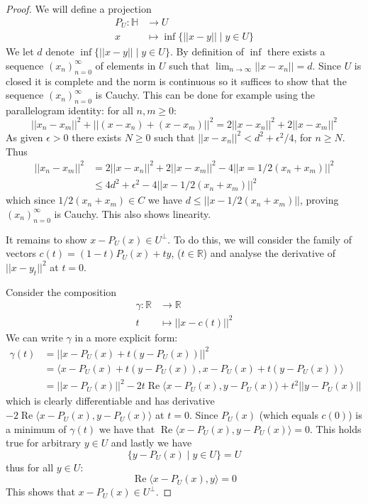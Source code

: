 \documentclass[12pt]{article}
\theoremstyle{plain}
\theoremstyle{definition}
\newcommand{\bb}[1]{\mathbb{#1}}
\newcommand{\lto}{\longrightarrow}
\begin{document}
\begin{proof}
We will define a projection
\begin{align*}
    P_U: \bb{H} &\lto U\\
    x &\longmapsto \operatorname{inf}\lbrace ||x - y|| \mid y \in U\rbrace
\end{align*}
We let $d$ denote $\operatorname{inf}\lbrace ||x - y|| \mid y \in U\rbrace$. By definition of $\operatorname{inf}$ there exists a sequence $(x_n)_{n=0}^\infty$ of elements in $U$ such that $\lim_{n\to \infty}||x - x_n|| = d$. Since $U$ is closed it is complete and the norm is continuous so it suffices to show that the sequence $(x_n)_{n=0}^\infty$ is Cauchy. This can be done for example using the parallelogram identity: for all $n,m\geq 0$:
\begin{equation}
    ||x_n - x_m||^2 + ||(x - x_n) + (x - x_m)||^2 = 2||x - x_n||^2 + 2||x - x_m||^2
\end{equation}
As given $\epsilon > 0$ there exists $N \geq 0$ such that $||x - x_n||^2 < d^2 + \epsilon^2/4$, for $n \geq N$. Thus
\begin{align*}
    ||x_n - x_m||^2 &= 2||x - x_n||^2 + 2||x - x_m||^2 - 4||x = 1/2(x_n + x_m)||^2\\
    &\leq 4d^2 + \epsilon^2 - 4||x - 1/2(x_n + x_m)||^2
\end{align*}
which since $1/2(x_n + x_m) \in C$ we have $d \leq ||x - 1/2(x_n + x_m)||$, proving $(x_n)_{n = 0}^\infty$ is Cauchy. This also shows linearity.

It remains to show $x - P_U(x) \in U^\perp$. To do this, we will consider the family of vectors $c(t) = (1-t)P_U(x) + ty$, ($t \in \bb{R}$) and analyse the derivative of $||x - y_t||^2$ at $t = 0$.

Consider the composition
\begin{align}
    \gamma: \bb{R} &\lto \bb{R}\\
    t &\longmapsto ||x - c(t)||^2
\end{align}
We can write $\gamma$ in a more explicit form:
\begin{align*}
    \gamma(t) &= ||x - P_U(x) + t(y - P_U(x))||^2\\
    &= \big\langle x - P_U(x) + t(y - P_U(x)),x - P_U(x) + t(y - P_U(x))\big\rangle\\
    &= ||x - P_U(x)||^2 - 2t\operatorname{Re}\langle  x - P_U(x),y - P_U(x)\rangle + t^2||y - P_U(x)||
\end{align*}
which is clearly differentiable and has derivative $- 2\operatorname{Re}\langle  x - P_U(x),y - P_U(x)\rangle$ at $t = 0$. Since $P_U(x)$ (which equals $c(0)$) is a minimum of $\gamma(t)$ we have that $\operatorname{Re}\langle  x - P_U(x),y - P_U(x)\rangle = 0$. This holds true for arbitrary $y \in U$ and lastly we have
\[\lbrace y - P_U(x) \mid y \in U \rbrace = U\]
thus for all $y \in U$:
\begin{equation}
    \operatorname{Re}\langle  x - P_U(x),y\rangle = 0
\end{equation}
This shows that $x - P_U(x) \in U^\perp$.
\end{proof}
\end{document}
